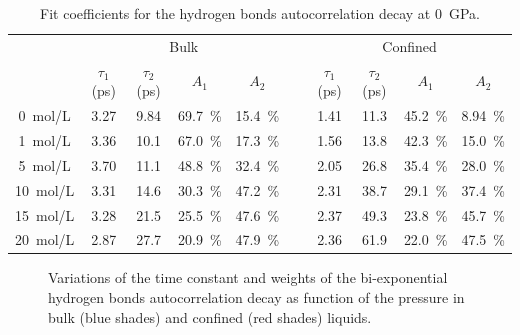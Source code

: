 \documentclass[thesis]{subfiles}
\begin{document}
\begin{table}[b]
    \caption{Fit coefficients for the hydrogen bonds autocorrelation decay at \SI{0}{GPa}.}
    \label{table:licl-zif:hbonds}
    \centering
    \begin{tabular}{c c c c c c c c c c}
        \toprule
        \multicolumn{1}{c}{~} & \multicolumn{4}{c}{Bulk}                          &~& \multicolumn{4}{c}{Confined} \\
        \multicolumn{1}{c}{~} & $\tau_1$ (ps) & $\tau_2$ (ps) & $A_1$   & $A_2$   &~& $\tau_1$ (ps) & $\tau_2$ (ps) & $A_1$   & $A_2$   \\
        \midrule
        \SI{0}{mol/L}         &    3.27       &    9.84       & 69.7~\% & 15.4~\% &~&  1.41         &  11.3         & 45.2~\% & 8.94~\% \\
        \SI{1}{mol/L}         &    3.36       &    10.1       & 67.0~\% & 17.3~\% &~&  1.56         &  13.8         & 42.3~\% & 15.0~\% \\
        \SI{5}{mol/L}         &    3.70       &    11.1       & 48.8~\% & 32.4~\% &~&  2.05         &  26.8         & 35.4~\% & 28.0~\% \\
        \SI{10}{mol/L}        &    3.31       &    14.6       & 30.3~\% & 47.2~\% &~&  2.31         &  38.7         & 29.1~\% & 37.4~\% \\
        \SI{15}{mol/L}        &    3.28       &    21.5       & 25.5~\% & 47.6~\% &~&  2.37         &  49.3         & 23.8~\% & 45.7~\% \\
        \SI{20}{mol/L}        &    2.87       &    27.7       & 20.9~\% & 47.9~\% &~&  2.36         &  61.9         & 22.0~\% & 47.5~\% \\
        \bottomrule
    \end{tabular}
\end{table}

\begin{figure}[ht]
    \centering
    
    \caption{Variations of the time constant and weights of the bi-exponential
    hydrogen bonds autocorrelation decay as function of the pressure in bulk
    (blue shades) and confined (red shades) liquids.}
    \label{fig:licl-zif:hbonds:fit:pressure}
\end{figure}

%     
\end{document}
